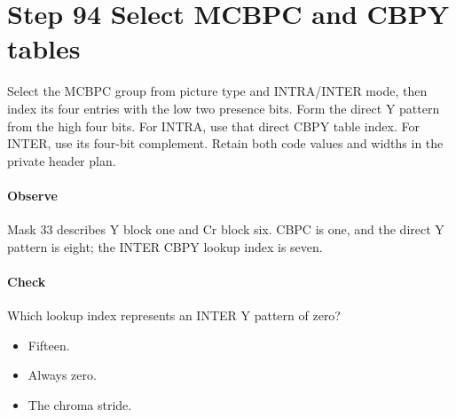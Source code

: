 \section{Step 94 Select MCBPC and CBPY tables}\label{h263-syntax-s04}
Select the MCBPC group from picture type and INTRA/INTER mode, then index its
four entries with the low two presence bits. Form the direct Y pattern from
the high four bits. For INTRA, use that direct CBPY table index. For INTER, use
its four-bit complement. Retain both code values and widths in the private header plan.

\paragraph{Observe} Mask 33 describes Y block one and Cr block six. CBPC is one,
and the direct Y pattern is eight; the INTER CBPY lookup index is seven.
\paragraph{Check} Which lookup index represents an INTER Y pattern of zero?
\begin{itemize}
  \item[A.] Fifteen.
  \item[B.] Always zero.
  \item[C.] The chroma stride.
\end{itemize}
